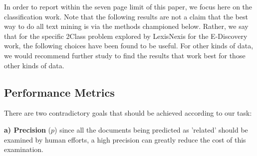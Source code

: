 \documentclass{sig-alternate-05-2015}
\newcommand{\bi}{\begin{itemize*}}
\newcommand{\ei}{\end{itemize*}}
\theoremstyle{break}
\begin{document}
In order to report within
the seven page limit of this paper, we focus here on the
classification work. 
Note that the following results are not a claim that the
best way to do all text mining is via the methods
championed below. Rather, we say that for the specific 2Class
problem explored by LexisNexis for the E-Discovery work,
the following choices have been found to be useful. For other
kinds of data, we would recommend further study to find
the results that work best for those other kinds of data.

\subsection{Performance Metrics}


There are two contradictory goals that should be achieved according to our task: 

\textbf{a) Precision} ($p$) since all the documents being predicted as 'related' should be examined by human efforts, a high precision can greatly reduce the cost of this examination.
\end{document}
